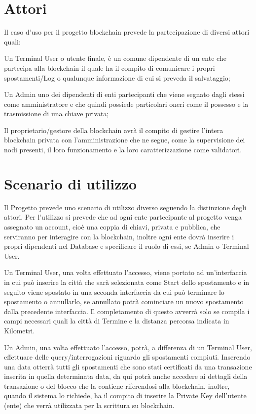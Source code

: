 \documentclass[11pt,a4paper,titlepage,twoside,openright]{report}
\begin{document}
\section{Attori}
Il caso d'uso per il progetto blockchain prevede la partecipazione di diversi attori quali: 

Un Terminal User o utente finale, è un comune dipendente di un ente che partecipa alla blockchain il quale ha il compito di comunicare i propri spostamenti/Log o qualunque informazione di cui si preveda il salvataggio;

Un Admin uno dei dipendenti di enti partecipanti che viene segnato dagli stessi come amministratore e che quindi possiede  particolari oneri come il possesso e la trasmissione di una chiave privata;

Il proprietario/gestore della blockchain avrà il compito di gestire l'intera blockchain privata con l'amministrazione che ne segue, come la supervisione dei nodi presenti, il loro funzionamento e la loro caratterizzazione come validatori. 

\section{Scenario di utilizzo}
Il Progetto prevede uno scenario di utilizzo diverso seguendo la distinzione degli attori.
Per l'utilizzo si prevede che ad ogni ente partecipante al progetto venga assegnato un account, cioè una coppia di chiavi, privata e pubblica, che serviranno per interagire con la blockchain, inoltre ogni ente dovrà inserire i propri dipendenti nel Database e specificare il ruolo di essi, se Admin o Terminal User.

Un Terminal User, una volta effettuato l'accesso, viene portato ad un'interfaccia in cui può inserire la città che sarà selezionata come Start dello spostamento e in seguito viene spostato in una seconda interfaccia da cui può terminare lo spostamento o annullarlo, se annullato potrà cominciare un nuovo spostamento dalla precedente interfaccia. Il completamento di questo avverrà solo se compila i campi necessari quali la città di Termine e la distanza percorsa indicata in Kilometri.

Un Admin, una volta effettuato l'accesso, potrà, a differenza di un Terminal User, effettuare delle query/interrogazioni riguardo gli spostamenti compiuti. Inserendo una data otterrà tutti gli spostamenti che sono stati certificati da una transazione inserita in quella determinata data, da qui potrà anche accedere ai dettagli della transazione o del blocco che la contiene riferendosi alla blockchain, inoltre, quando il sistema lo richiede, ha il compito di inserire la Private Key dell'utente (ente) che verrà utilizzata per la scrittura su blockchain.
\end{document}
